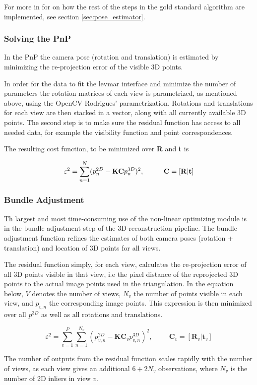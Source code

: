 For more in for on how the rest of the steps in the gold standard algorithm are implemented, see section \ref{sec:pose_estimator}.
\newpage

\subsubsection{Solving the PnP}
In the PnP the camera pose (rotation and translation) is estimated by minimizing the re-projection error of the visible 3D points.

In order for the data to fit the levmar interface and minimize the number of parameters the rotation matrices of each view is parametrized, as mentioned above, using the OpenCV Rodrigues' parametrization. Rotations and translations for each view are then stacked in a vector, along with all currently available 3D points. The second step is to make sure the residual function has access to all needed data, for example the visibility function and point correspondences.

The resulting cost function, to be minimized over \textbf{R} and \textbf{t} is

\begin{equation}
\label{eq:PnP}
\varepsilon^2 = \sum_{n=1}^{N} (p_n^{2D} - \textbf{KC}p_{n}^{3D})^2, \hspace{1cm} \textbf{C} = [\bf{R} | \bf{t}]
\end{equation} 

\subsubsection{Bundle Adjustment}
Th largest and most time-consuming use of the non-linear optimizing module is in the bundle adjustment step of the 3D-reconstruction pipeline. The bundle adjustment function refines the estimates of both camera poses (rotation + translation) and location of 3D points for all views. 

The residual function simply, for each view, calculates the re-projection error of all 3D points visible in that view, i.e the pixel distance of the reprojected 3D points to the actual image points used in the triangulation. In the equation below, $V$ denotes the number of views, $N_v$ the number of points visible in each view, and $p_{v,n}$ the corresponding image points. This expression is then minimized over all $p^{3D}$ as well as all rotations and translations. 

\begin{equation}
\label{eq:BA}
\varepsilon^2 = \sum_{v=1}^{P}\sum_{n=1}^{N_v} (p_{v,n}^{2D} - \textbf{KC}_vp_{v,n}^{3D})^2, \hspace{1cm} \textbf{C}_v = [\textbf{R}_v | \textbf{t}_v]
\end{equation} 


The number of outputs from the residual function scales rapidly with the number of views, as each view gives an additional $ 6 + 2N_v $ observations, where $ N_v $ is the number of 2D inliers in view $v$.





